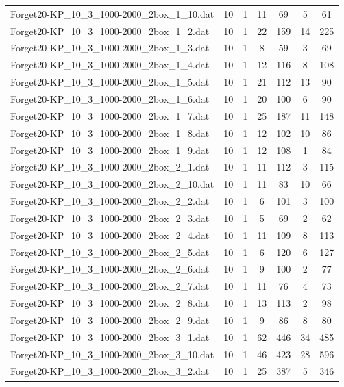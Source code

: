 \begin{table}[!ht]
\begin{tabular}{lcccccc}
Forget20-KP\_10\_3\_1000-2000\_2box\_1\_10.dat & 10 & 1 & 11 & 69 & 5 & 61 \\
Forget20-KP\_10\_3\_1000-2000\_2box\_1\_2.dat & 10 & 1 & 22 & 159 & 14 & 225 \\
Forget20-KP\_10\_3\_1000-2000\_2box\_1\_3.dat & 10 & 1 & 8 & 59 & 3 & 69 \\
Forget20-KP\_10\_3\_1000-2000\_2box\_1\_4.dat & 10 & 1 & 12 & 116 & 8 & 108 \\
Forget20-KP\_10\_3\_1000-2000\_2box\_1\_5.dat & 10 & 1 & 21 & 112 & 13 & 90 \\
Forget20-KP\_10\_3\_1000-2000\_2box\_1\_6.dat & 10 & 1 & 20 & 100 & 6 & 90 \\
Forget20-KP\_10\_3\_1000-2000\_2box\_1\_7.dat & 10 & 1 & 25 & 187 & 11 & 148 \\
Forget20-KP\_10\_3\_1000-2000\_2box\_1\_8.dat & 10 & 1 & 12 & 102 & 10 & 86 \\
Forget20-KP\_10\_3\_1000-2000\_2box\_1\_9.dat & 10 & 1 & 12 & 108 & 1 & 84 \\
Forget20-KP\_10\_3\_1000-2000\_2box\_2\_1.dat & 10 & 1 & 11 & 112 & 3 & 115 \\
Forget20-KP\_10\_3\_1000-2000\_2box\_2\_10.dat & 10 & 1 & 11 & 83 & 10 & 66 \\
Forget20-KP\_10\_3\_1000-2000\_2box\_2\_2.dat & 10 & 1 & 6 & 101 & 3 & 100 \\
Forget20-KP\_10\_3\_1000-2000\_2box\_2\_3.dat & 10 & 1 & 5 & 69 & 2 & 62 \\
Forget20-KP\_10\_3\_1000-2000\_2box\_2\_4.dat & 10 & 1 & 11 & 109 & 8 & 113 \\
Forget20-KP\_10\_3\_1000-2000\_2box\_2\_5.dat & 10 & 1 & 6 & 120 & 6 & 127 \\
Forget20-KP\_10\_3\_1000-2000\_2box\_2\_6.dat & 10 & 1 & 9 & 100 & 2 & 77 \\
Forget20-KP\_10\_3\_1000-2000\_2box\_2\_7.dat & 10 & 1 & 11 & 76 & 4 & 73 \\
Forget20-KP\_10\_3\_1000-2000\_2box\_2\_8.dat & 10 & 1 & 13 & 113 & 2 & 98 \\
Forget20-KP\_10\_3\_1000-2000\_2box\_2\_9.dat & 10 & 1 & 9 & 86 & 8 & 80 \\
Forget20-KP\_10\_3\_1000-2000\_2box\_3\_1.dat & 10 & 1 & 62 & 446 & 34 & 485 \\
Forget20-KP\_10\_3\_1000-2000\_2box\_3\_10.dat & 10 & 1 & 46 & 423 & 28 & 596 \\
Forget20-KP\_10\_3\_1000-2000\_2box\_3\_2.dat & 10 & 1 & 25 & 387 & 5 & 346 \\

\end{tabular}
\end{table}
